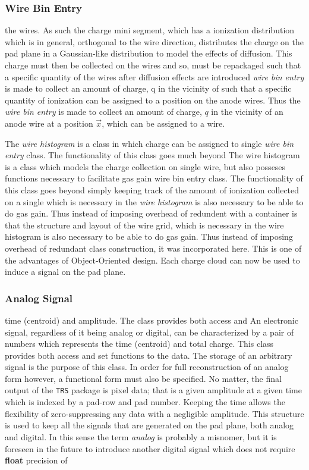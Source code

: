 \documentclass[twoside]{article}
\newcommand{\comp}[1]{\texttt{#1}}%
\begin{document}
\subsubsection{Wire Bin Entry}
the wires.  As such the charge mini segment, which has a ionization
distribution which is in general, orthogonal to the wire direction,
distributes the charge on the pad plane in a Gaussian-like distribution
to model the effects of diffusion.  This charge must then be collected
on the wires and so, must be repackaged such that a specific quantity of
the wires after diffusion effects are introduced 
{\em wire bin entry} is made to collect an amount of charge, q in the vicinity of
such that a specific quantity of
ionization can be assigned to a position on the anode wires.  Thus the
{\em wire bin entry} is made to collect an amount of charge, $q$ in the vicinity of
an anode wire at a position $\vec{x}$, which can be assigned to a wire.

The {\em wire histogram} is a class in which charge can be assigned to single
\label{sec:wireHistogram}
{\em wire bin entry} class.  The functionality of this class goes much beyond
The wire histogram is a class which models the charge collection on single
wire, but also posseses functions necessary to facilitate gas gain
wire bin entry class.  The functionality of this class goes beyond
simply keeping track of the amount of ionization collected on a single
which is necessary in the {\em wire histogram} is also necessary to be
able to do gas gain.  Thus instead of imposing overhead of redundent
with a container is that the structure and layout of the wire grid,
which is necessary in the wire histogram is also necessary to be
able to do gas gain.  Thus instead of imposing overhead of redundant
class construction, it was incorporated here.  This is one of the advantages
of Object-Oriented design.  Each charge cloud can now be used to
induce a signal on the pad plane.

\subsubsection{Analog Signal}
\label{sec:analogSignal}
time (centroid) and amplitude.  The class provides both access and
An electronic signal, regardless of it being analog or digital,
can be characterized by a pair of numbers which represents the
time (centroid) and total charge.  This class provides both access and
set functions to the data.  The storage of an
arbitrary signal is the purpose of this class.  In order for full
reconstruction of an analog form however, a functional form must also
be specified.  No matter, the final output of the \comp{TRS} package
is pixel data; that is a given amplitude at a given time which is
indexed by a pad-row and pad number.  Keeping the time allows the
flexibility of zero-suppressing any data with a negligible amplitude.
This structure is used to keep all the signals that are generated on the
pad plane, both analog and digital.  In this sense the term {\em analog}
is probably a misnomer, but it is foreseen in the future to introduce
another digital signal which does not require {\bf float} precision of
\end{document}
